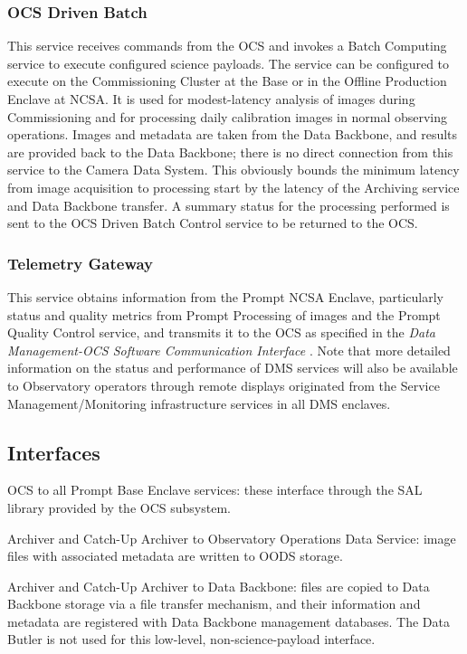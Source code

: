 \documentclass[DM,toc]{lsstdoc}
\begin{document}
\subsubsection{OCS Driven Batch}\label{ocs-driven-batch}

This service receives commands from the OCS and invokes a Batch Computing service to execute configured science payloads.
The service can be configured to execute on the Commissioning Cluster at the Base or in the Offline Production Enclave at NCSA.
It is used for modest-latency analysis of images during Commissioning and for processing daily calibration images in normal observing operations.
Images and metadata are taken from the Data Backbone, and results are provided back to the Data Backbone; there is no direct connection from this service to the Camera Data System.
This obviously bounds the minimum latency from image acquisition to processing start by the latency of the Archiving service and Data Backbone transfer.
A summary status for the processing performed is sent to the OCS Driven Batch Control service to be returned to the OCS.

\subsubsection{Telemetry Gateway}\label{telemetry-gateway}

This service obtains information from the Prompt NCSA Enclave,
particularly status and quality metrics from Prompt Processing of images
and the Prompt Quality Control service, and transmits it to the OCS as
specified in the \textit{Data Management-OCS Software Communication Interface}
. Note that more detailed information on the status and
performance of DMS services will also be available to Observatory
operators through remote displays originated from the
Service Management/Monitoring infrastructure services in all DMS enclaves.

\subsection{Interfaces}\label{base-interfaces}

OCS to all Prompt Base Enclave services: these interface through the SAL
library provided by the OCS subsystem.

Archiver and Catch-Up Archiver to Observatory Operations Data Service:
image files with associated metadata are written to OODS storage.

Archiver and Catch-Up Archiver to Data Backbone: files are copied to
Data Backbone storage via a file transfer mechanism, and their
information and metadata are registered with Data Backbone management
databases. The Data Butler is not used for this low-level,
non-science-payload interface.
\end{document}

